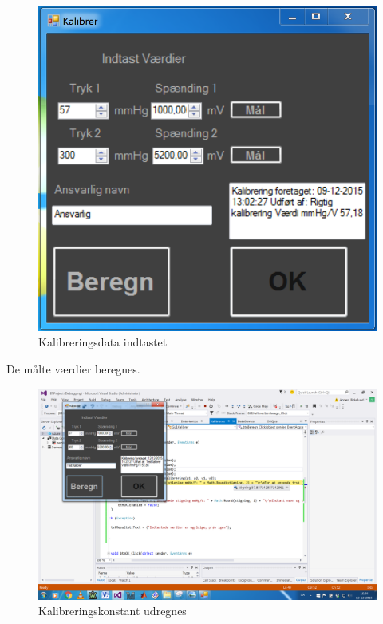 \begin{figure}[H]
	\centering
	\includegraphics[width=1\textwidth]{Figurer/Test_Kalibrer_1}
	\caption{Kalibreringsdata indtastet}
\end{figure}

De målte værdier beregnes.

\begin{figure}[H]
	\centering
	\includegraphics[width=1\textwidth]{Figurer/Test_Kalibrer_2}
	\caption{Kalibreringskonstant udregnes}
\end{figure}


